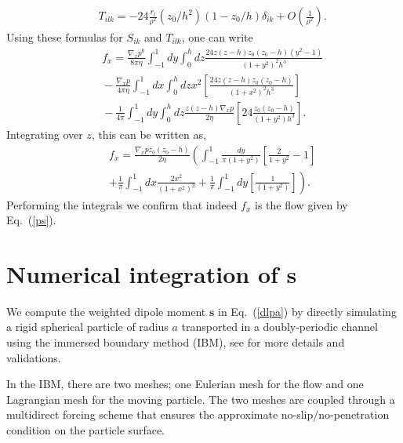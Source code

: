 \begin{eqnarray}&&\!\!\!\!\!\!\!\!\!\!
T_{ilk}=-24\frac{r_l}{\rho^2}(z_0/ h^2)(1-z_0/h)\delta_{ik}+O\left(\frac{1}{\rho^2}\right).
\end{eqnarray}
Using these formulas for $S_{ik}$ and $T_{ilk}$, one can write
\begin{eqnarray}&&\!\!\!\!\!\!\!\!\!\!
f_x=\frac{\nabla_x p^0}{8\pi\eta} \int_{-1}^1 dy\int_0^h dz \frac{24z(z-h)z_0(z_0-h)(y^2-1)}{(1+y^2)^2 h^3}\nonumber\\&&\!\!\!\!\!\!\!\!\!\!-\frac{\nabla_x p}{4\pi\eta} \int_{-1}^1 dx\int_0^h dz x^2\left[
\frac{24z(z-h)z_0(z_0-h)}{(1+x^2)^2 h^3}\right]
\nonumber\\&&\!\!\!\!\!\!\!\!\!\!-\frac{1}{4\pi} \int_{-1}^1 dy\int_0^h dz \frac{z(z-h)\nabla_x p}{2\eta}\left[24\frac{z_0(z_0-h)}{(1+y^2)h^3}\right]\nonumber.
\end{eqnarray}
Integrating over $z$, this can be written as,
\begin{eqnarray}&&\!\!\!\!\!\!\!\!\!\!
f_x=\frac{\nabla_x p z_0(z_0-h)}{2\eta}\left( \int_{-1}^1 \frac{dy}{\pi(1+y^2)}\left[\frac{2}{1+y^2}-1\right]\right.\nonumber\\&&\!\!\!\!\!\!\!\!\!\!\left.+\frac{1}{\pi} \int_{-1}^1 dx \frac{2x^2}{(1+x^2)^2}+\frac{1}{\pi} \int_{-1}^1 dy \left[\frac{1}{(1+y^2)}\right]\right).%
\end{eqnarray}
Performing the integrals we confirm that indeed $f_x$ is the flow given by Eq.~(\ref{ps}).





\section{Numerical integration of $\bm s$}\label{numm}

We compute the weighted dipole moment $\bm s$ in Eq.~(\ref{dlpa}) by directly simulating a rigid spherical particle of radius $a$ transported in a doubly-periodic channel using the immersed boundary method (IBM), see \cite{ibm,ruth,picano} for more details and validations. 

In the IBM, there are two meshes; one Eulerian mesh for the flow and one
Lagrangian mesh for the moving particle. The two meshes are coupled through a multidirect forcing scheme that ensures the approximate no-slip/no-penetration condition on the particle surface.

